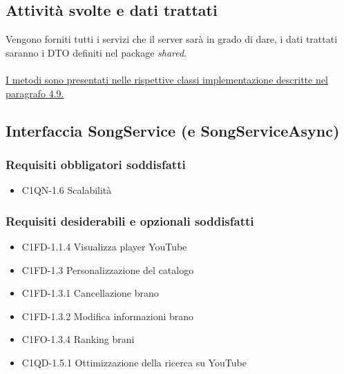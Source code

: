 \subsection*{Attivit\`a svolte e dati trattati}
Vengono forniti tutti i servizi che il server sar\`a in grado di dare, i dati
trattati saranno i DTO definiti nel package \emph{shared}.\\\\
\underline{I metodi sono presentati nelle rispettive classi implementazione
descritte nel paragrafo 4.9.}

\subsection{Interfaccia SongService (e SongServiceAsync)}
\subsubsection*{Requisiti obbligatori soddisfatti}
\begin{itemize}
	\item C1QN-1.6 Scalabilit\`a
\end{itemize}
\subsubsection*{Requisiti desiderabili e opzionali soddisfatti}
\begin{itemize}
    \item C1FD-1.1.4 Visualizza player YouTube
    \item C1FD-1.3 Personalizzazione del catalogo
    \item C1FD-1.3.1 Cancellazione brano
    \item C1FD-1.3.2 Modifica informazioni brano
    \item C1FO-1.3.4 Ranking brani
    \item C1QD-1.5.1 Ottimizzazione della ricerca su YouTube
\end{itemize}
